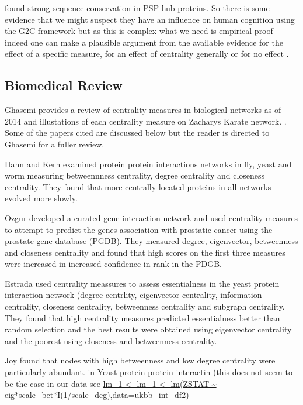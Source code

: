 \cite{bayes2011characterization} found strong sequence conservation in PSP hub proteins. So there is some evidence that we might suspect they have an influence on human cognition using the G2C framework but as this is complex what we need is empirical proof indeed one can make a plausible argument from the available evidence for the effect of a specific measure, for an effect of centrality generally or for no effect .  


\subsection{ Biomedical Review}
Ghasemi provides a review of centrality measures in biological networks as of 2014 and illustations of each centrality measure on Zacharys Karate network.
\cite{ghasemi2014centrality}. Some of the papers cited are discussed below but the reader is directed to Ghasemi \cite{ghasemi2014centrality} for a fuller review. 

Hahn and Kern\cite{hahn2005comparative} examined protein protein interactions networks in fly, yeast and worm measuring betweennness centrality, degree centrality and closeness centrality. They found that more centrally located proteins in all networks evolved more slowly. 

Ozgur \cite{ozgur2008identifying} developed a curated gene interaction network and used centrality measures to attempt to predict the genes association with prostatic cancer using the prostate gene database (PGDB). They measured degree, eigenvector, betweenness and closeness centrality and found that high scores on the first three measures were increased in increased confidence in rank in the PDGB.

Estrada \cite{estrada2006virtual} used centrality meassures to assess essentialness in the yeast protein interaction network (degree centrlity, eigenvector centrality, information centrality, closeness centrality, betweenness centrality and subgraph centrality. They found that high centrality measures predicted essentialness better than random selection and  the best results were obtained using eigenvector centrality and the poorest using closeness and betweenness centrality. 

Joy found that nodes with high betweenness and low degree centrality were particularly abundant.\cite{joy2005high} in Yeast protein protein interactin (this does not seem to be the case in our data see \url{lm_1 <- lm_1 <- lm(ZSTAT ~  eig*scale_bet*I(1/scale_deg),data=ukbb_int_df2)}

